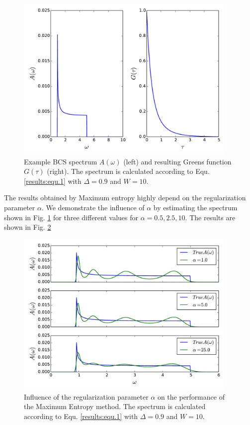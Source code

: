 \documentclass[10pt,letterpaper]{article}
\begin{document}
\begin{figure}[htbp]
	\centering
	\includegraphics[width=0.95\textwidth]{./images/BCS_A_G_example.pdf}
	\caption{Example BCS spectrum $A(\omega)$ (left) and resulting Greens function $G(\tau)$ (right). The spectrum is calculated according to Equ. \ref{results:equ.1} with $\Delta = 0.9$ and $W = 10$.}
	\label{results:fig.1}
\end{figure}
\FloatBarrier
The results obtained by Maximum entropy highly depend on the regularization parameter $\alpha$. We demonstrate the influence of $\alpha$ by estimating the spectrum shown in Fig. \ref{results:fig.1} for three different values for $\alpha = 0.5,2.5,10$. The results are shown in Fig. \ref{results:fig.2}
\begin{figure}[htbp]
	\centering
	\includegraphics[width=0.95\textwidth]{./images/BCS_varying_alpha.pdf}
	\caption{Influence of the regularization parameter $\alpha$ on the performance of the Maximum Entropy method. The spectrum is calculated according to Equ. \ref{results:equ.1} with $\Delta = 0.9$ and $W = 10$.}
	\label{results:fig.2}
\end{figure}
\end{document}

